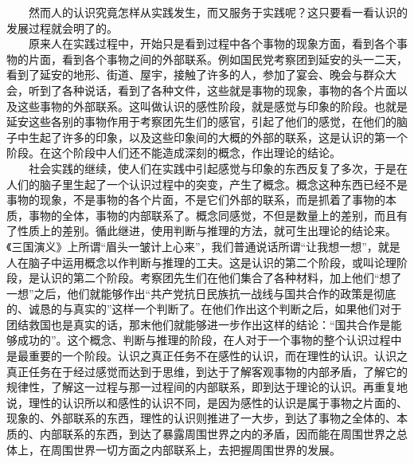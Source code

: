 \documentclass[cn,11pt,chinese]{elegantbook}
\begin{document}
　　然而人的认识究竟怎样从实践发生，而又服务于实践呢？这只要看一看认识的发展过程就会明了的。\\
　　原来人在实践过程中，开始只是看到过程中各个事物的现象方面，看到各个事物的片面，看到各个事物之间的外部联系。例如国民党考察团到延安的头一二天，看到了延安的地形、街道、屋宇，接触了许多的人，参加了宴会、晚会与群众大会，听到了各种说话，看到了各种文件，这些就是事物的现象，事物的各个片面以及这些事物的外部联系。这叫做认识的感性阶段，就是感觉与印象的阶段。也就是延安这些各别的事物作用于考察团先生们的感官，引起了他们的感觉，在他们的脑子中生起了许多的印象，以及这些印象间的大概的外部的联系，这是认识的第一个阶段。在这个阶段中人们还不能造成深刻的概念，作出理论的结论。\\
　　社会实践的继续，使人们在实践中引起感觉与印象的东西反复了多次，于是在人们的脑子里生起了一个认识过程中的突变，产生了概念。概念这种东西已经不是事物的现象，不是事物的各个片面，不是它们外部的联系，而是抓着了事物的本质，事物的全体，事物的内部联系了。概念同感觉，不但是数量上的差别，而且有了性质上的差别。循此继进，使用判断与推理的方法，就可生出理论的结论来。《三国演义》上所谓“眉头一皱计上心来”，我们普通说话所谓“让我想一想”，就是人在脑子中运用概念以作判断与推理的工夫。这是认识的第二个阶段，或叫论理阶段，是认识的第二个阶段。考察团先生们在他们集合了各种材料，加上他们“想了一想”之后，他们就能够作出“共产党抗日民族抗一战线与国共合作的政策是彻底的、诚恳的与真实的”这样一个判断了。在他们作出这个判断之后，如果他们对于团结救国也是真实的话，那末他们就能够进一步作出这样的结论：“国共合作是能够成功的”。这个概念、判断与推理的阶段，在人对于一个事物的整个认识过程中是最重要的一个阶段。认识之真正任务不在感性的认识，而在理性的认识。认识之真正任务在于经过感觉而达到于思维，到达于了解客观事物的内部矛盾，了解它的规律性，了解这一过程与那一过程间的内部联系，即到达于理论的认识。再重复地说，理性的认识所以和感性的认识不同，是因为感性的认识是属于事物之片面的、现象的、外部联系的东西，理性的认识则推进了一大步，到达了事物之全体的、本质的、内部联系的东西，到达了暴露周围世界之内的矛盾，因而能在周围世界之总体上，在周围世界一切方面之内部联系上，去把握周围世界的发展。\\
\end{document}
